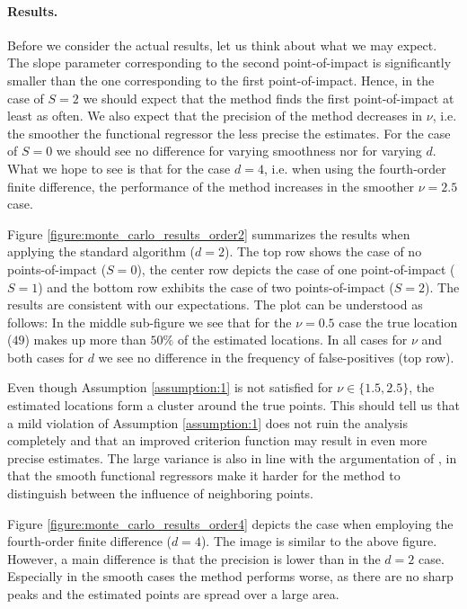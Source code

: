 \paragraph{Results.}

Before we consider the actual results, let us think about what we may expect. The slope
parameter corresponding to the second point-of-impact is significantly smaller than the
one corresponding to the first point-of-impact. Hence, in the case of $S = 2$ we should
expect that the method finds the first point-of-impact at least as often. We also expect
that the precision of the method decreases in $\nu$, i.e. the smoother the functional
regressor the less precise the estimates. For the case of $S = 0$ we should see no
difference for varying smoothness nor for varying $d$. What we hope to see is that for
the case $d = 4$, i.e. when using the fourth-order finite difference, the performance of
the method increases in the smoother $\nu = 2.5$ case.

Figure \ref{figure:monte_carlo_results_order2} summarizes the results when applying the
standard algorithm ($d = 2$). The top row shows the case of no points-of-impact ($S =
0$), the center row depicts the case of one point-of-impact ($S = 1$) and the bottom row
exhibits the case of two points-of-impact ($S = 2$). The results are consistent with our
expectations. The plot can be understood as follows: In the middle sub-figure we see
that for the $\nu = 0.5$ case the true location ($49$) makes up more than $50\%$ of the
estimated locations. In all cases for $\nu$ and both cases for $d$ we see no difference
in the frequency of false-positives (top row).

Even though Assumption \ref{assumption:1} is not satisfied for $\nu \in \{1.5, 2.5\}$,
the estimated locations form a cluster around the true points. This should tell us that
a mild violation of Assumption \ref{assumption:1} does not ruin the analysis completely
and that an improved criterion function may result in even more precise estimates. The
large variance is also in line with the argumentation of \cite{Kneip2020}, in that the
smooth functional regressors make it harder for the method to distinguish between the
influence of neighboring points.

Figure \ref{figure:monte_carlo_results_order4} depicts the case when employing the
fourth-order finite difference ($d = 4$). The image is similar to the above figure.
However, a main difference is that the precision is lower than in the $d=2$ case.
Especially in the smooth cases the method performs worse, as there are no sharp peaks
and the estimated points are spread over a large area.

